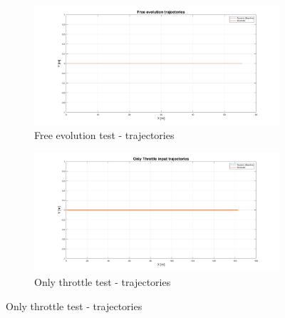 \begin{figure}[H]
\centering

    \begin{subfigure}{.5\textwidth}
    \centering
   \includegraphics[width=1.1\textwidth,keepaspectratio]{Figures/Free_evo_traj.png}
    \caption{Free evolution test - trajectories}
    \label{subfig:free_evo}
    \end{subfigure}%
    \begin{subfigure}{.5\textwidth}
    \centering
    \includegraphics[width=1.1\textwidth,keepaspectratio]{Figures/Throttle_traj.png}
    \caption{Only throttle test - trajectories}
    \label{subfig:only_throttle}
    \end{subfigure}
    
    \vspace{10mm}
    

\end{figure}
